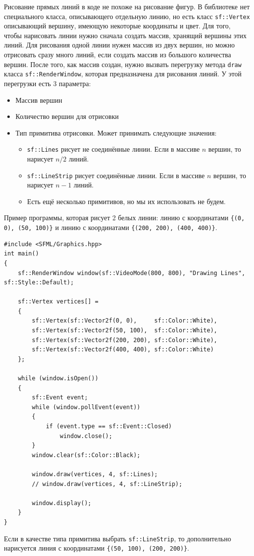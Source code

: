 \documentclass{article}
\begin{document}
Рисование прямых линий в коде не похоже на рисование фигур. В библиотеке нет специального класса, описывающего отдельную линию, но есть класс \texttt{sf::Vertex} описывающий вершину, имеющую некоторые координаты и цвет.
Для того, чтобы нарисовать линии нужно сначала создать массив, хранящий вершины этих линий. Для рисования одной линии нужен массив из двух вершин, но можно отрисовать сразу много линий, если создать массив из большого количества вершин.
После того, как массив создан, нужно вызвать перегрузку метода \texttt{draw} класса \texttt{sf::RenderWindow}, которая предназначена для рисования линий. У этой перегрузки есть 3 параметра:

\begin{itemize}
\item Массив вершин
\item Количество вершин для отрисовки
\item Тип примитива отрисовки. Может принимать следующие значения:
\begin{itemize}
\item \texttt{sf::Lines} рисует не соединённые линии.
Если в массиве $n$ вершин, то нарисует $n / 2$ линий.
\item \texttt{sf::LineStrip} рисует соединённые линии. 
Если в массиве $n$ вершин, то нарисует $n - 1$ линий.
\item Есть ещё несколько примитивов, но мы их использовать не будем.
\end{itemize}
\end{itemize}

Пример программы, которая рисует 2 белых линии: линию с координатами \texttt{\{(0, 0), (50, 100)\}} и линию с координатами \texttt{\{(200, 200), (400, 400)\}}.
\begin{lstlisting}
#include <SFML/Graphics.hpp>
int main()
{
    sf::RenderWindow window(sf::VideoMode(800, 800), "Drawing Lines", sf::Style::Default);
    
    sf::Vertex vertices[] =
    {
        sf::Vertex(sf::Vector2f(0, 0),     sf::Color::White),
        sf::Vertex(sf::Vector2f(50, 100),  sf::Color::White),
        sf::Vertex(sf::Vector2f(200, 200), sf::Color::White),
        sf::Vertex(sf::Vector2f(400, 400), sf::Color::White)
    };
    
    while (window.isOpen())
    {
        sf::Event event;
        while (window.pollEvent(event)) 
        {
            if (event.type == sf::Event::Closed)
                window.close();
        }
        window.clear(sf::Color::Black);
        
        window.draw(vertices, 4, sf::Lines);
        // window.draw(vertices, 4, sf::LineStrip);
        
        window.display();
    }
}
\end{lstlisting}
Если в качестве типа примитива выбрать \texttt{sf::LineStrip}, то дополнительно нарисуется линия с координатами \texttt{\{(50, 100), (200, 200)\}}.
\end{document}

